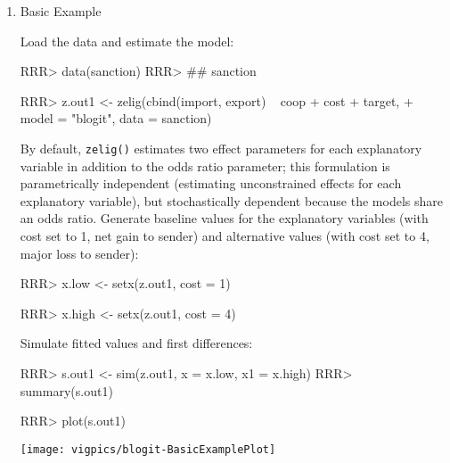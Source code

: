 \begin{enumerate}

\item {Basic Example} \label{basic.bl}

Load the data and estimate the model:  
\begin{Schunk}
\begin{Sinput}
RRR>  data(sanction)
RRR> ## sanction
\end{Sinput}
\end{Schunk}
\begin{Schunk}
\begin{Sinput}
RRR>  z.out1 <- zelig(cbind(import, export) ~ coop + cost + target, 
+                   model = "blogit", data = sanction)
\end{Sinput}
\end{Schunk}
By default, {\tt zelig()} estimates two effect parameters
for each explanatory variable in addition to the odds ratio parameter;
this formulation is parametrically independent (estimating
unconstrained effects for each explanatory variable), but
stochastically dependent because the models share an odds ratio.
\newline \newline Generate baseline values for the explanatory
variables (with cost set to 1, net gain to sender) and alternative
values (with cost set to 4, major loss to sender):
\begin{Schunk}
\begin{Sinput}
RRR>  x.low <- setx(z.out1, cost = 1)
\end{Sinput}
\end{Schunk}
\begin{Schunk}
\begin{Sinput}
RRR> x.high <- setx(z.out1, cost = 4)
\end{Sinput}
\end{Schunk}
Simulate fitted values and first differences:  
\begin{Schunk}
\begin{Sinput}
RRR>  s.out1 <- sim(z.out1, x = x.low, x1 = x.high)
RRR>  summary(s.out1)
\end{Sinput}
\end{Schunk}
\begin{center}
\begin{Schunk}
\begin{Sinput}
RRR>  plot(s.out1)
\end{Sinput}
\end{Schunk}
\texttt{[image: vigpics/blogit-BasicExamplePlot]}
\end{center}


\end{enumerate}
